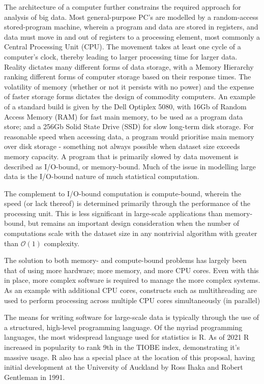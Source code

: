 \documentclass[a4paper,10pt]{article}
\begin{document}
The architecture of a computer further constrains the required approach for analysis of big data.
Most general-purpose PC's are modelled by a random-access stored-program machine, wherein a program and data are stored in registers, and data must move in and out of registers to a processing element, most commonly a Central Processing Unit (CPU). 
The movement takes at least one cycle of a computer's clock, thereby leading to larger processing time for larger data.
Reality dictates many different forms of data storage, with a Memory Hierarchy ranking different forms of computer storage based on their response times\cite{toy1986computer}.
The volatility of memory (whether or not it persists with no power) and the expense of faster storage forms dictates the design of commodity computers. An example of a standard build is given by the Dell Optiplex 5080, with 16Gb of Random Access Memory (RAM) for fast main memory, to be used as a program data store; and a 256Gb Solid State Drive (SSD) for slow long-term disk storage\cite{cornell2021standardcomp}.
For reasonable speed when accessing data, a program would prioritise main memory over disk storage - something not always possible when dataset size exceeds memory capacity.
A program that is primarily slowed by data movement is described as I/O-bound, or memory-bound.
Much of the issue in modelling large data is the I/O-bound nature of much statistical computation.

The complement to I/O-bound computation is compute-bound, wherein the speed (or lack thereof) is determined primarily through the performance of the processing unit. This is less significant in large-scale applications than memory-bound, but remains an important design consideration when the number of computations scale with the dataset size in any nontrivial algorithm with greater than \(\mathcal{O}(1)\) complexity.

The solution to both memory- and compute-bound problems has largely been that of using more hardware; more memory, and more CPU cores. Even with this in place, more complex software is required to manage the more complex systems. As an example with additional CPU cores, constructs such as multithreading are used to perform processing across multiple CPU cores simultaneously (in parallel)

The means for writing software for large-scale data is typically through the use of a structured, high-level programming language.
Of the myriad programming languages, the most widespread language used for statistics is R.
As of 2021 R increased in popularity to rank 9th in the TIOBE index, demonstrating it's massive usage.
R also has a special place at the location of this proposal, having initial development at the University of Auckland by Ross Ihaka and Robert Gentleman in 1991\cite{ihaka1996r}.
\end{document}
